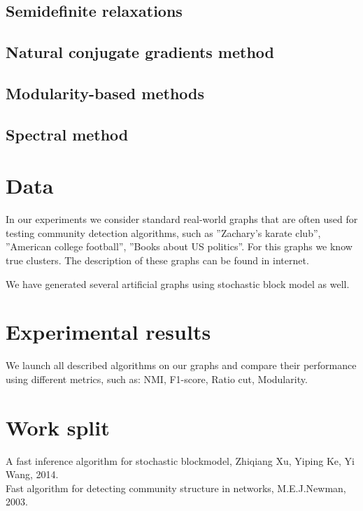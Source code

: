 \documentclass[11pt,a4paper]{extarticle}
\begin{document}
	\subsection{Semidefinite relaxations}
	\subsection{Natural conjugate gradients method}
		
	\subsection{Modularity-based methods}
		
	\subsection{Spectral method}

\section{Data}

	In our experiments we consider standard real-world graphs that are often used for testing community detection algorithms, such as ''Zachary's karate club'', ''American college football'', ''Books about US politics''. For this graphs we know true clusters. The description of these graphs can be found in internet.

	We have generated several artificial graphs using stochastic block model as well.

\section{Experimental results}
	We launch all described algorithms on our graphs and compare their performance using different metrics, such as: NMI, F1-score, Ratio cut, Modularity.


\section{Work split}


\renewcommand{\refname}{References}
\begin{thebibliography}{9}
    A fast inference algorithm for stochastic blockmodel, Zhiqiang Xu, Yiping Ke, Yi Wang, 2014. \\
    Fast algorithm for detecting community structure in networks, M.E.J.Newman, 2003.\\
\end{thebibliography}
\end{document}
